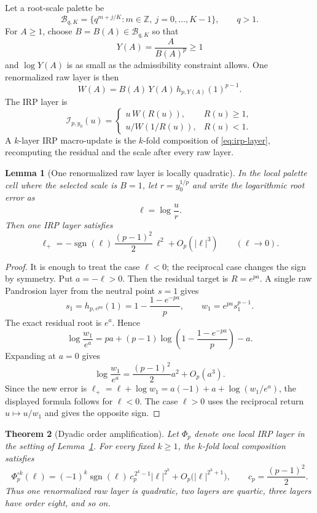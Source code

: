 \documentclass[10pt,a4paper]{article}
\theoremstyle{plain}
\newtheorem{theorem}{Theorem}[section]
\newtheorem{lemma}[theorem]{Lemma}
\theoremstyle{definition}
\theoremstyle{remark}
\newcommand{\IRP}{\mathcal I}
\begin{document}
Let a root-scale palette be
\[
  \mathcal B_{q,K}=\{q^{m+j/K}:m\in\mathbb Z,
  \ j=0,\ldots,K-1\},\qquad q>1.
\]
For $A\ge1$, choose $B=B(A)\in\mathcal B_{q,K}$ so that
\[
  Y(A)=\frac{A}{B(A)^p}\ge1
\]
and $\log Y(A)$ is as small as the admissibility constraint allows.  One
renormalized raw layer is then
\[
  W(A)=B(A)\,Y(A)\,h_{p,Y(A)}(1)^{p-1}.
\]
The IRP layer is
\begin{equation}
  \IRP_{p,y_0}(u)=
  \begin{cases}
    u\,W(R(u)), & R(u)\ge1,\\[0.35em]
    u/W(1/R(u)), & R(u)<1.
  \end{cases}
  \label{eq:irp-layer}
\end{equation}
A $k$-layer IRP macro-update is the $k$-fold composition of
\eqref{eq:irp-layer}, recomputing the residual and the scale after every raw
layer.

\begin{lemma}[One renormalized raw layer is locally quadratic]
\label{lem:irp-one-layer}
In the local palette cell where the selected scale is $B=1$, let
$r=y_0^{1/p}$ and write the logarithmic root error as
\[
  \ell=\log\frac{u}{r}.
\]
Then one IRP layer satisfies
\begin{equation}
  \ell_+
  =-\operatorname{sgn}(\ell)\,\frac{(p-1)^2}{2}\,\ell^2
  +O_p(|\ell|^3)
  \qquad (\ell\to0).
  \label{eq:irp-quadratic-layer}
\end{equation}
\end{lemma}

\begin{proof}
It is enough to treat the case $\ell<0$; the reciprocal case changes the sign
by symmetry.  Put $a=-\ell>0$.  Then the residual target is
$R=e^{pa}$.  A single raw Pandrosion layer from the neutral point $s=1$ gives
\[
  s_1=h_{p,e^{pa}}(1)=1-\frac{1-e^{-pa}}{p},
  \qquad
  w_1=e^{pa}s_1^{p-1}.
\]
The exact residual root is $e^a$.  Hence
\[
  \log\frac{w_1}{e^a}
  =pa+(p-1)\log\left(1-\frac{1-e^{-pa}}{p}\right)-a.
\]
Expanding at $a=0$ gives
\[
  \log\frac{w_1}{e^a}
  =\frac{(p-1)^2}{2}a^2+O_p(a^3).
\]
Since the new error is $\ell_+=\ell+\log w_1=a(-1)+a+
\log(w_1/e^a)$, the displayed formula follows for $\ell<0$.  The case
$\ell>0$ uses the reciprocal return $u\mapsto u/w_1$ and gives the opposite
sign.
\end{proof}

\begin{theorem}[Dyadic order amplification]
\label{thm:irp-dyadic}
Let $\Phi_p$ denote one local IRP layer in the setting of
Lemma~\ref{lem:irp-one-layer}.  For every fixed $k\ge1$, the $k$-fold local
composition satisfies
\begin{equation}
  \Phi_p^{\circ k}(\ell)
  =(-1)^k\operatorname{sgn}(\ell)\,
    c_p^{\,2^k-1}|\ell|^{2^k}
    +O_p\bigl(|\ell|^{2^k+1}\bigr),
  \qquad c_p=\frac{(p-1)^2}{2}.
  \label{eq:irp-exact-order}
\end{equation}
Thus one renormalized raw layer is quadratic, two layers are quartic, three
layers have order eight, and so on.
\end{theorem}
\end{document}

